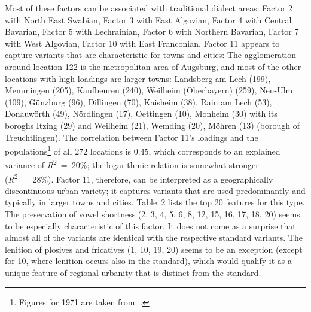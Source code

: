 \documentclass[output=paper]{LSP/langsci}
\begin{document}
Most of these factors can be associated with traditional dialect areas: Factor 2 with North East Swabian, Factor 3 with East Algovian, Factor 4 with Central Bavarian, Factor 5 with Lechrainian, Factor 6 with Northern Bavarian, Factor 7 with West Algovian, Factor 10 with East Franconian. Factor 11 appears to capture variants that are characteristic for towns and cities: The agglomeration around location 122 is the metropolitan area of Augsburg, and most of the other locations with high loadings are larger towns: Landsberg am Lech (199), Memmingen (205), Kaufbeuren (240), Weilheim (Oberbayern) (259), Neu-Ulm (109), Günzburg (96), Dillingen (70), Kaisheim (38), Rain am Lech (53), Donauwörth (49), Nördlingen (17), Oettingen (10), Monheim (30) with its boroghs Itzing (29) and Weilheim (21), Wemding (20), Möhren (13) (borough of Treuchtlingen). The correlation between Factor 11’s loadings and the populations\footnote{Figures for 1971 are taken from: \citet{bayerisches_statistisches_landesamt_einwohnerzahlen_1972}.} of all 272 locations is 0.45, which corresponds to an explained variance of \textit{R}\textsuperscript{2}~=~20\%; the logarithmic relation is somewhat stronger (\textit{R}\textsuperscript{2}~=~28\%). Factor 11, therefore, can be interpreted as a geographically discontinuous urban variety; it captures variants that are used predominantly and typically in larger towns and cities. Table~2 lists the top 20 features for this type. The preservation of vowel shortness (2, 3, 4, 5, 6, 8, 12, 15, 16, 17, 18, 20) seems to be especially characteristic of this factor. It does not come as a surprise that almost all of the variants are identical with the respective standard variants. The lenition of plosives and fricatives (1, 10, 19, 20) seems to be an exception (except for 10, where lenition occurs also in the standard), which would qualify it as a unique feature of regional urbanity that is distinct from the standard.
\end{document}

